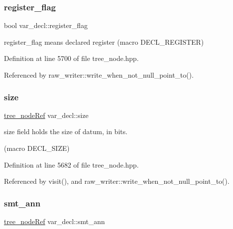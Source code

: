 \mbox{\label{structvar__decl_abde3560ae9954ac4c62449fd10dfe6a5}} 
\subsubsection{\texorpdfstring{register\+\_\+flag}{register\_flag}}
{\footnotesize\ttfamily bool var\+\_\+decl\+::register\+\_\+flag}



register\+\_\+flag means declared \textquotesingle{}register\textquotesingle{} (macro D\+E\+C\+L\+\_\+\+R\+E\+G\+I\+S\+T\+ER) 



Definition at line 5700 of file tree\+\_\+node.\+hpp.



Referenced by raw\+\_\+writer\+::write\+\_\+when\+\_\+not\+\_\+null\+\_\+point\+\_\+to().

\mbox{\label{structvar__decl_a9410677ae223d8604f3ac95bc235b84f}} 
\subsubsection{\texorpdfstring{size}{size}}
{\footnotesize\ttfamily \hyperlink{tree__node_8hpp_a6ee377554d1c4871ad66a337eaa67fd5}{tree\+\_\+node\+Ref} var\+\_\+decl\+::size}



size field holds the size of datum, in bits. 

(macro D\+E\+C\+L\+\_\+\+S\+I\+ZE) 

Definition at line 5682 of file tree\+\_\+node.\+hpp.



Referenced by visit(), and raw\+\_\+writer\+::write\+\_\+when\+\_\+not\+\_\+null\+\_\+point\+\_\+to().

\mbox{\label{structvar__decl_a4306d64ca0058b391f6b04da32508069}} 
\subsubsection{\texorpdfstring{smt\+\_\+ann}{smt\_ann}}
{\footnotesize\ttfamily \hyperlink{tree__node_8hpp_a6ee377554d1c4871ad66a337eaa67fd5}{tree\+\_\+node\+Ref} var\+\_\+decl\+::smt\+\_\+ann}



